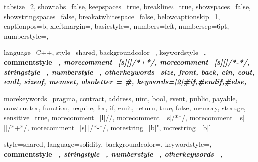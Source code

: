  {
  tabsize=2,
	showtabs=false,
	keepspaces=true,
  breaklines=true,
  showspaces=false,
  showstringspaces=false,
	breakatwhitespace=false,
  belowcaptionskip=1\baselineskip,
	captionpos=b,
  xleftmargin=\parindent,
	basicstyle=\ttfamily\footnotesize,
  numbers=left,
  numbersep=6pt,
	numberstyle=\tiny\color{lavenderindigo},
}


 {
  language=C++,
  style=shared,
	backgroundcolor=\color{eggshell},
	keywordstyle=\bfseries\color{egyptianblue},
	commentstyle=\itshape\color{lava},
  morecomment=[s][\color{forestgreen}]{/*+}{*/},
  morecomment=[s][\color{harvardcrimson}]{/*-}{*/},
	stringstyle=\color{greencssgreen},
	numberstyle=\tiny\color{lavenderindigo},
  otherkeywords={size, front, back, cin, cout, endl, sizeof, memset},
  alsoletter = {\#},
  keywords=[2]{\#if,\#endif,\#else},
}

 {
  morekeywords={pragma, contract, address, uint, bool, event, public,
    payable, constructor, function, require, for, if, emit, return,
    true, false, memory, storage},
  sensitive=true,
  morecomment=[l]{//},
  morecomment=[s]{/*}{*/},
  morecomment=[s][\color{forestgreen}]{/*+}{*/},
  morecomment=[s][\color{harvardcrimson}]{/*-}{*/},
  morestring=[b]",
  morestring=[b]'
}

 {
  style=shared,
  language=solidity,
	backgroundcolor=\color{eggshell},
	keywordstyle=\bfseries\color{egyptianblue},
	commentstyle=\itshape\color{lava},
	stringstyle=\color{greencssgreen},
	numberstyle=\tiny\color{lavenderindigo},
  otherkeywords={},
}